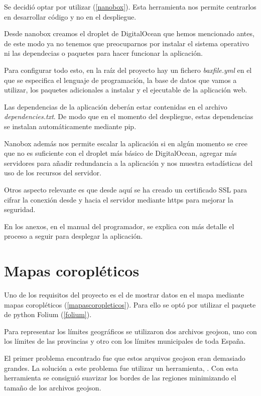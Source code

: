 Se decidió optar por utilizar  (\ref{nanobox}). Esta herramienta nos permite centrarlos en desarrollar código y no en el despliegue.

Desde nanobox creamos el droplet de DigitalOcean que hemos mencionado antes, de este modo ya no tenemos que preocuparnos por instalar el sistema operativo ni las dependecias o paquetes para hacer funcionar la aplicación.

Para configurar todo esto, en la raíz del proyecto hay un fichero \textit{baxfile.yml} en el que se especifica el lenguaje de programación, la base de datos que vamos a utilizar, los paquetes adicionales a instalar y el ejecutable de la aplicación web.

Las dependencias de la aplicación deberán estar contenidas en el archivo \textit{dependencies.txt}. De modo que en el momento del despliegue, estas dependencias se instalan automáticamente mediante pip.

Nanobox además nos permite escalar la aplicación si en algún momento se cree que no es suficiente con el droplet más básico de DigitalOcean, agregar más servidores para añadir redundancia a la aplicación y nos muestra estadísticas del uso de los recursos del servidor.

Otros aspecto relevante es que desde aquí se ha creado un certificado SSL para cifrar la conexión  desde y hacia el servidor mediante https para mejorar la seguridad.

En los anexos, en el manual del programador, se explica con más detalle el proceso a seguir para desplegar la aplicación.

\section{Mapas coropléticos}

Uno de los requisitos del proyecto es el de mostrar datos en el mapa mediante mapas coropléticos (\ref{mapascoropleticos}). Para ello se optó por utilizar el paquete de python Folium (\ref{folium}).

Para representar los límites geográficos se utilizaron dos archivos geojson, uno con los límites de las provincias y otro con los límites municipales de toda España.

El primer problema encontrado fue que estos arquivos geojson eran demasiado grandes. La solución a este problema fue utilizar un herramienta, . Con esta herramienta se consiguió suavizar los bordes de las regiones minimizando el tamaño de los archivos geojson.

